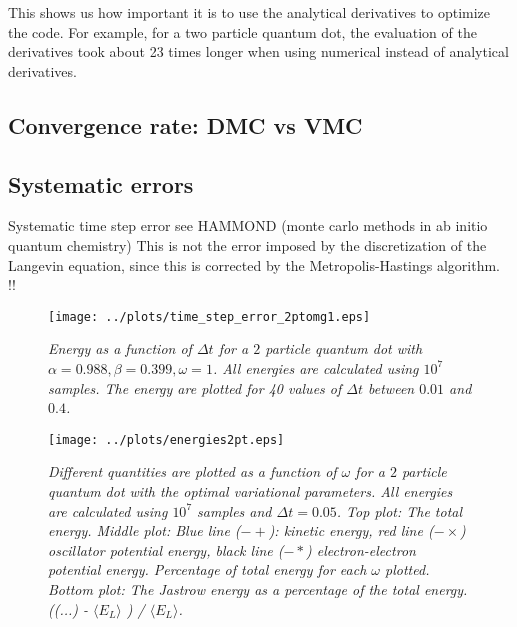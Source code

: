 \documentclass[a4paper,10pt,twocolumn]{article} %
\newcommand{\expec}[1]{\langle{}{#1}\rangle{}}
\begin{document}
This shows us how important it is to use the analytical derivatives to optimize the code. 
For example, for a two particle quantum dot, the evaluation of the derivatives took about 23 times longer when using numerical instead of analytical derivatives.

\subsection{Convergence rate: DMC vs VMC}



\subsection{Systematic errors}

Systematic time step error see HAMMOND \cite{hammond} (monte carlo methods in ab initio quantum chemistry)
This is not the error imposed by the discretization of the Langevin equation, since this is corrected by the Metropolis-Hastings algorithm. !!

\begin{figure}[h!]
\begin{center}
\caption{{\it%
			Energy as a function of $\Delta t$ for a $2$ particle quantum dot with $\alpha=0.988,\beta=0.399,\omega=1$. All energies are calculated using $10^7$ samples.
			The energy are plotted for 40 values of $\Delta t$ between $0.01$ and $0.4$. 
		}}
		\label{fig:ef}
	\texttt{[image: ../plots/time\_step\_error\_2ptomg1.eps]}
\end{center}
\end{figure}

\begin{figure}[h!]
\begin{center}
\caption{{\it%
			Different quantities are plotted as a function of $\omega$ for a $2$ particle quantum dot with the optimal variational parameters. 
			All energies are calculated using $10^7$ samples and $\Delta t = 0.05$.
			Top plot: The total energy.
			Middle plot:
			Blue line ($-+$): kinetic energy, red line ($-\times$) oscillator potential energy, black line ($-*$) electron-electron potential energy.
			Percentage of total energy for each $\omega$ plotted.
			Bottom plot: The Jastrow energy as a percentage of the total energy. ((...) - $\expec{E_L}$ ) / $\expec{E_L}$. 
		}}
		\label{figes}
	\texttt{[image: ../plots/energies2pt.eps]}
\end{center}
\end{figure}
\end{document}
